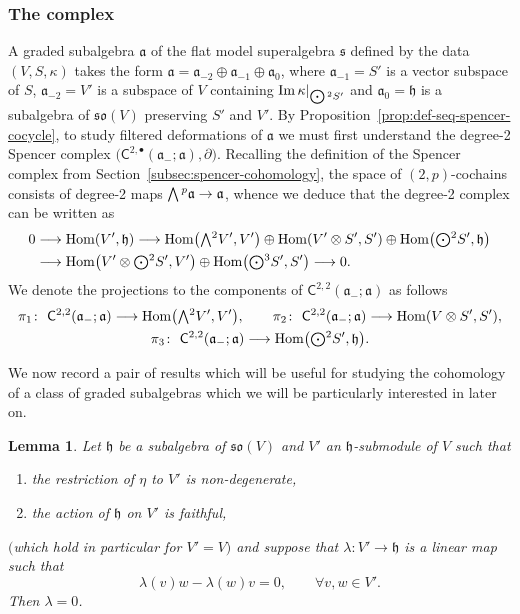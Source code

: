 \documentclass[11pt]{article}
\numberwithin{equation}{section}
\numberwithin{equation}{section}
\newtheorem{Lemma}[Theorem]{Lemma}
\newcommand{\fa}{\mathfrak{a}}
\newcommand{\fh}{\mathfrak{h}}
\newcommand{\fs}{\mathfrak{s}}
\newcommand{\fso}{\mathfrak{so}}
\newcommand{\ssC}{\mathsf{C}}
\newcommand{\Wedge}{\mathchoice{{\textstyle\bigwedge}}{\bigwedge}{\bigwedge}{\bigwedge}}	%
\newcommand{\Odot}{\mathchoice{{\textstyle\bigodot}}{\bigodot}{\bigodot}{\bigodot}}
\newcommand{\1}{\mathbbm{1}}
\DeclareMathOperator{\Hom}{Hom}
\begin{document}
\subsubsection{The complex}

A graded subalgebra $\fa$ of the flat model superalgebra $\fs$ defined by the data $(V,S,\kappa)$ takes the form $\fa=\fa_{-2}\oplus\fa_{-1}\oplus\fa_0$, where $\fa_{-1}=S'$ is a vector subspace of $S$, $\fa_{-2}=V'$ is a subspace of $V$ containing $\Im \kappa|_{\Odot^2S'}$ and $\fa_0=\fh$ is a subalgebra of $\fso(V)$ preserving $S'$ and $V'$. By Proposition~\ref{prop:def-seq-spencer-cocycle}, to study filtered deformations of $\fa$ we must first understand the degree-2 Spencer complex $\bigl(\ssC^{2,\bullet}(\fa_-;\fa),\partial\bigr)$. Recalling the definition of the Spencer complex from Section~\ref{subsec:spencer-cohomology}, the space of $(2,p)$-cochains consists of degree-2 maps $\Wedge^p\fa\to\fa$, whence we deduce that the degree-2 complex can be written as
\begin{align*}
	0 &\longrightarrow \Hom(V',\fh)
\longrightarrow \Hom\bigl(\Wedge^2V',V'\bigr)\oplus\Hom(V'\otimes S',S')\oplus\Hom\bigl(\Odot^2S',\fh\bigr)\\
	&\longrightarrow \Hom\bigl(V'\otimes\Odot^2S',V'\bigr)\oplus\Hom\bigl(\Odot^3S',S'\bigr)\longrightarrow 0.
\end{align*}
We denote the projections to the components of $\ssC^{2,2}(\fa_-;\fa)$ as follows
\begin{gather*}
	\pi_1\colon\ \ssC^{2,2}(\fa_-;\fa) \longrightarrow \Hom\bigl(\Wedge^2V',V'\bigr),\qquad
	\pi_2\colon\ \ssC^{2,2}(\fa_-;\fa) \longrightarrow \Hom(V\otimes S',S'),\\
	\pi_3\colon\ \ssC^{2,2}(\fa_-;\fa) \longrightarrow \Hom\bigl(\Odot^2S',\fh\bigr).
\end{gather*}

We now record a pair of results which will be useful for studying the cohomology of a class of graded subalgebras which we will be particularly interested in later on.

\begin{Lemma}\label{lemma:V-h-maps}
	Let $\fh$ be a subalgebra of $\fso(V)$ and $V'$ an $\fh$-submodule of $V$ such that
	\begin{enumerate}\itemsep=0pt
		\item[$(1)$] the restriction of $\eta$ to $V'$ is non-degenerate,
		\item[$(2)$] the action of $\fh$ on $V'$ is faithful,
	\end{enumerate}
	$($which hold in particular for $V'=V)$ and suppose that $\lambda\colon V'\to\fh$ is a linear map such that
	\[%
		\lambda(v)w - \lambda(w)v = 0, \qquad \forall v,w\in V'.
	\]
	Then $\lambda=0$.
\end{Lemma}
\end{document}
